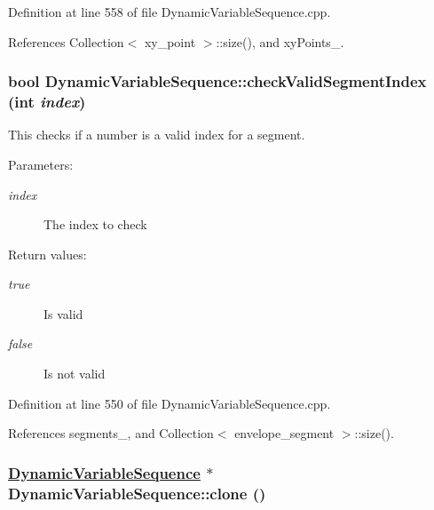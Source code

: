 Definition at line 558 of file Dynamic\-Variable\-Sequence.cpp.

References Collection$<$ xy\_\-point $>$::size(), and xy\-Points\_\-.\hypertarget{classDynamicVariableSequence_d2}{
\subsubsection[checkValidSegmentIndex]{\setlength{\rightskip}{0pt plus 5cm}bool Dynamic\-Variable\-Sequence::check\-Valid\-Segment\-Index (int {\em index})}}
\label{classDynamicVariableSequence_d2}


This checks if a number is a valid index for a segment. \begin{Desc}
\item[Parameters:]
\begin{description}
\item[{\em index}]The index to check \end{description}
\end{Desc}
\begin{Desc}
\item[Return values:]
\begin{description}
\item[{\em true}]Is valid \item[{\em false}]Is not valid \end{description}
\end{Desc}


Definition at line 550 of file Dynamic\-Variable\-Sequence.cpp.

References segments\_\-, and Collection$<$ envelope\_\-segment $>$::size().\hypertarget{classDynamicVariableSequence_a4}{
\subsubsection[clone]{\setlength{\rightskip}{0pt plus 5cm}\hyperlink{classDynamicVariableSequence}{Dynamic\-Variable\-Sequence} $\ast$ Dynamic\-Variable\-Sequence::clone ()}}
\label{classDynamicVariableSequence_a4}


